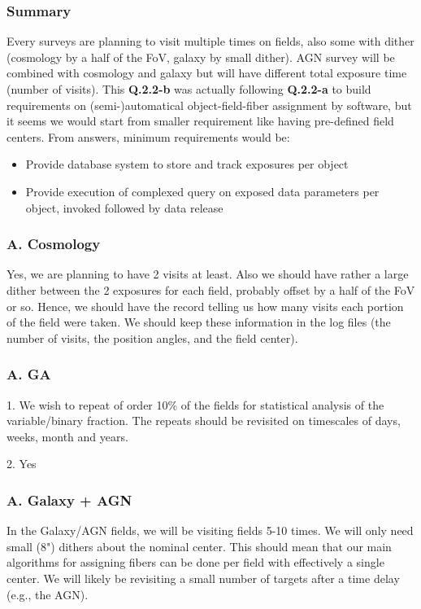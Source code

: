 \documentclass[a4paper,notitlepage]{article}
\begin{document}
\subsubsection{Summary}

Every surveys are planning to visit multiple times on fields, also some with 
dither (cosmology by a half of the FoV, galaxy by small dither). 
AGN survey will be combined with cosmology and galaxy but will have different 
total exposure time (number of visits). 
This {\bf Q.2.2-b} was actually following {\bf Q.2.2-a} to build requirements 
on (semi-)automatical object-field-fiber assignment by software, but it seems 
we would start from smaller requirement like having pre-defined field centers. 
From answers, minimum requirements would be: 
\begin{itemize}
  \item Provide database system to store and track exposures per object
  \item Provide execution of complexed query on exposed data parameters per 
    object, invoked followed by data release
\end{itemize}

\subsubsection{A. Cosmology}

Yes, we are planning to have 2 visits at least. Also we should have
rather a large dither between the 2 exposures for each field, probably
offset by a half of the FoV or so. Hence, we should have the record
telling us how many visits each portion of the field were taken. We
should keep these information in the log files (the number of visits,
the position angles, and the field center).

\subsubsection{A. GA}
1. We wish to repeat of order 10\% of the fields for statistical
analysis of the variable/binary fraction. The repeats should be
revisited on timescales of days, weeks, month and years.

2. Yes

\subsubsection{A. Galaxy + AGN}

In the Galaxy/AGN fields, we will be visiting fields 5-10 times.  We
will only need small (8") dithers about the nominal center.  This
should mean that our main algorithms for assigning fibers can be done
per field with effectively a single center.  We will likely be revisiting a 
small number of targets after a time delay (e.g., the AGN).
\end{document}
